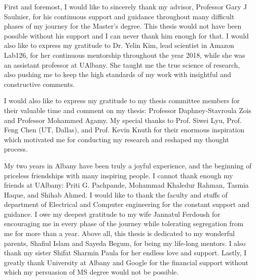 \documentclass[
12pt, %
english, %
doublespacing, %
liststotoc, %
toctotoc, %
]{MastersDoctoralThesis} %
\begin{document}
\begin{acknowledgements}
\addchaptertocentry{\acknowledgementname} %
\par First and foremost, I would like to sincerely thank my advisor, Professor Gary J Saulnier, for his continuous support and guidance throughout many difficult phases of my journey for the Master's degree. This
thesis would not have been possible without his support and I can never thank
him enough for that. I would also like to express my gratitude to Dr. Yelin Kim, lead scientist in Amazon Lab126, for her continuous mentorship throughout the year 2018, while she was an assistant professor at UAlbany. She taught me the true science of research, also pushing me to keep the high standards of my work with insightful and
constructive comments. 

I would also like to express my gratitude to my thesis committee members for their valuable time and comment on my thesis: Professor Daphney-Stavroula Zois and Professor Mohammed Agamy. My special thanks to Prof. Siwei Lyu, Prof. Feng Chen (UT, Dallas), and Prof. Kevin Knuth for their enormous inspiration which motivated me for conducting my research and reshaped my thought process. 

My two years in Albany have been truly a joyful experience, and the beginning
of priceless friendships with many inspiring people. I cannot thank enough my friends at UAlbany: Priti G. Pachpande, Mohammad Khaledur Rahman, Tasmia Haque, and Shihab Ahmed. I would like to thank the faculty and stuffs of department of Electrical and Computer engineering for the constant support and guidance. I owe my deepest gratitude to my wife Jannatul Ferdoush for encouraging me in every phase of the journey while tolerating segregation from me for more than a year. Above all, this thesis is dedicated to my wonderful parents, Shafiul Islam and Sayeda Begum, for being my life-long mentors. I also thank my sister Shifat Sharmin Paula for her endless love and support. Lastly, I greatly thank University at Albany and Google for the financial support without which  my persuasion of MS degree would not be possible.  


\end{acknowledgements}

\hypersetup{linkcolor=black}
\tableofcontents %
\end{document}
